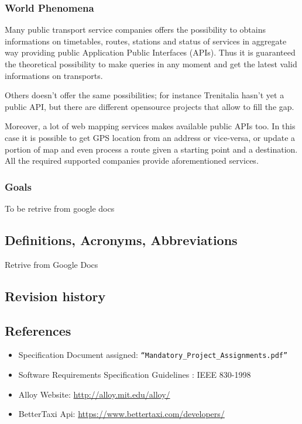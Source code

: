 \subsubsection{World Phenomena}

Many public transport service companies offers the possibility to obtains informations on timetables, routes, stations and status of services in aggregate way providing public Application Public Interfaces (APIs). Thus it is guaranteed the theoretical possibility to make queries in any moment and get the latest valid informations on transports.

Others doesn’t offer the same possibilities; for instance Trenitalia hasn’t yet a public API, but there are different opensource projects that allow to fill the gap.

Moreover, a lot of web mapping services makes available public APIs too. In this case it is possible to get GPS location from an address or vice-versa, or update a portion of map and even process a route given a starting point and a destination.
All the required supported companies provide aforementioned services.

\subsubsection{Goals}
{To be retrive from google docs}

\subsection{Definitions, Acronyms, Abbreviations}
Retrive from Google Docs

\subsection{Revision history}


\subsection{References}


\begin{itemize}
	\item Specification Document assigned: \texttt{“Mandatory\_Project\_Assignments.pdf”}
	\item Software Requirements Specification Guidelines : IEEE 830-1998
	\item Alloy Website: \url{http://alloy.mit.edu/alloy/}
	\item BetterTaxi Api: \url{https://www.bettertaxi.com/developers/}
\end{itemize}

